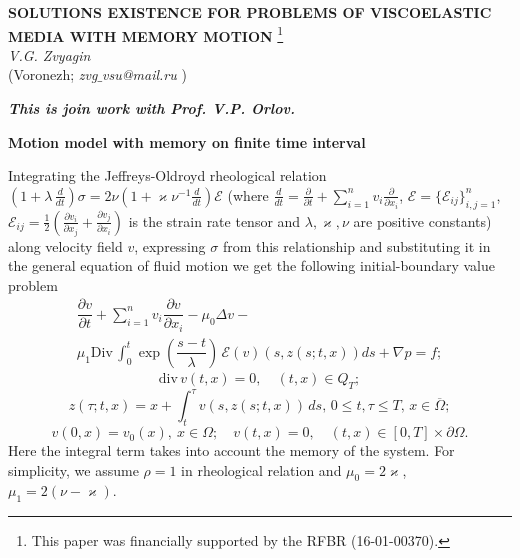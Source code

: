 \begin{center}{ \bf  SOLUTIONS EXISTENCE FOR PROBLEMS OF VISCOELASTIC MEDIA WITH MEMORY MOTION} \footnote{This paper was financially supported by the RFBR (16-01-00370).}\\
{\it V.G. Zvyagin } \\
(Voronezh; {\it zvg$\_$vsu@mail.ru} )
\end{center}

\begin{center}
{\bf\small \it This is join work with Prof. V.P. Orlov.}
\end{center}

{\bf Motion model with memory on finite time interval}

Integrating the Jeffreys-Oldroyd rheological relation $(1+\lambda \, \frac{d}{ d t}) \sigma = 2 \nu (1+ \varkappa \nu ^ {- 1} \frac{d}{ d t}) \mathcal{E}$
(where $ \frac{d}{ dt} = \frac{\partial}{\partial t} + \sum\limits_{i = 1}^ nv_i \frac{\partial}{\partial x_i}$, $\mathcal{E} = $$ \{\mathcal{E} _ {ij} \} _ {i, j = 1}^ n $, $\mathcal{E} _ {ij} = \frac {1} {2} (\frac{\partial v_i} {\partial x_j} + \frac{\partial v_j}  {\partial x_i }) $ is the strain rate tensor  and $\lambda, \varkappa, \nu $ are positive constants) along velocity field $v$, expressing $\sigma$ from this relationship and substituting it in the general equation of fluid motion we get the following initial-boundary value problem
\begin{multline*} \label{1a}
\dfrac{\partial v} {\partial t} + \sum\limits_{i = 1}^ n v_i \dfrac{\partial v} {\partial x_i} -\mu_0 \Delta v-\\
\mu_1 \mathrm{Div} \, \int_0 ^ t \exp {\left(\dfrac{s-t} {\lambda}\right)} \, \mathcal{E} (v) \left(s, z (s; t, x)\right) ds + \nabla p = f;
\end{multline*}
\begin{equation*} \label{2a}
\mathrm {div} \, v (t, x) = 0, \quad (t, x)  \in Q_T;
\end{equation*}
\begin{equation*} \label{3a}
z (\tau; t, x) = x + \int_t^{ \tau} v \left(s, z (s; t, x)\right) \, ds, \, 0 \leqslant t, \tau \leqslant T, \, x  \in \overline {\Omega};
\end{equation*}
\begin{equation*} \label{4a}
v (0, x) = v _ 0 (x),\ x\in \Omega; \quad v (t, x) = 0, \quad (t, x)  \in [0, T] \times \partial \Omega.
\end{equation*}
Here the integral term takes into account the memory of the system.
For simplicity, we assume $\rho = 1 $ in rheological relation and $\mu_0 = 2 \varkappa $, $\mu_1 \! = \! 2 (\nu- \varkappa) $.

